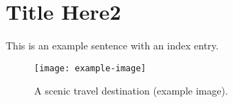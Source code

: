\newpage
\chapter{Title Here2}
This is an example sentence with an index entry.
\lipsum[1]  %
\begin{figure}[htbp]
  \centering
  \texttt{[image: example-image]} %
  \caption{A scenic travel destination (example image).}
\end{figure}
\lipsum[1]  %
\lipsum[2]  %




